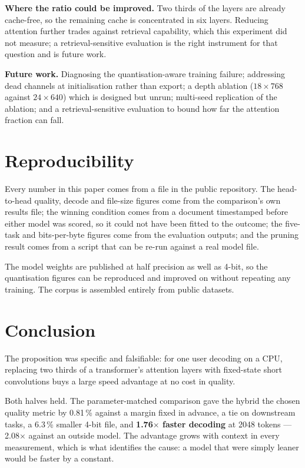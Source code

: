 \documentclass[conference]{IEEEtran}
\begin{document}
\textbf{Where the ratio could be improved.} Two thirds of the layers are already
cache-free, so the remaining cache is concentrated in six layers. Reducing
attention further trades against retrieval capability, which this experiment did
not measure; a retrieval-sensitive evaluation is the right instrument for that
question and is future work.

\textbf{Future work.} Diagnosing the quantisation-aware training failure;
addressing dead channels at initialisation rather than export; a depth ablation
($18\times768$ against $24\times640$) which is designed but unrun; multi-seed
replication of the ablation; and a retrieval-sensitive evaluation to bound how
far the attention fraction can fall.

\section{Reproducibility}

Every number in this paper comes from a file in the public repository. The
head-to-head quality, decode and file-size figures come from the comparison's
own results file; the winning condition comes from a document timestamped before
either model was scored, so it could not have been fitted to the outcome; the
five-task and bits-per-byte figures come from the evaluation outputs; and the
pruning result comes from a script that can be re-run against a real model file.

The model weights are published at half precision as well as 4-bit, so the
quantisation figures can be reproduced and improved on without repeating any
training. The corpus is assembled entirely from public datasets.

\section{Conclusion}

The proposition was specific and falsifiable: for one user decoding on a CPU,
replacing two thirds of a transformer's attention layers with fixed-state short
convolutions buys a large speed advantage at no cost in quality.

Both halves held. The parameter-matched comparison gave the hybrid the chosen
quality metric by 0.81\,\% against a margin fixed in advance, a tie on
downstream tasks, a 6.3\,\% smaller 4-bit file, and \textbf{1.76$\times$ faster
decoding} at 2048 tokens --- 2.08$\times$ against an outside model. The advantage
grows with context in every measurement, which is what identifies the cause: a
model that were simply leaner would be faster by a constant.
\end{document}
